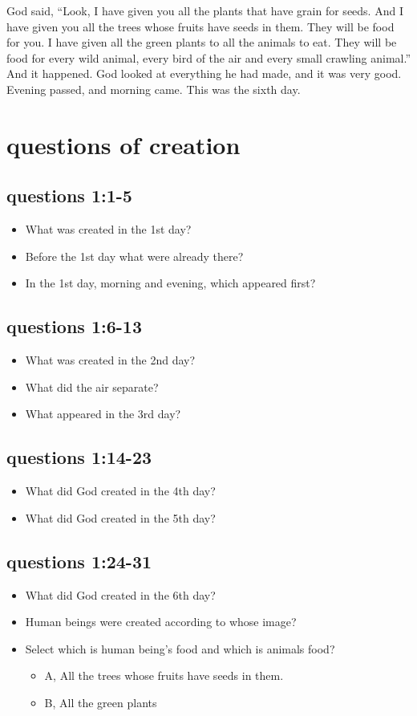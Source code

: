 God said, “Look, I have given you all the plants that have grain for seeds. And I have given you all the trees whose fruits have seeds in them. They will be food for you. I have given all the green plants to all the animals to eat. They will be food for every wild animal, every bird of the air and every small crawling animal.” And it happened. God looked at everything he had made, and it was very good. Evening passed, and morning came. This was the sixth day.

\newpage
\section{questions of creation}
\subsection{questions 1:1-5}
\begin{itemize}
\item What was created in the 1st day? 
\item Before the 1st day what were already there? 
\item In the 1st day, morning and evening, which appeared first?
\end{itemize}

\subsection{questions 1:6-13}
\begin{itemize}
\item What was created in the 2nd day?
\item What did the air separate?
\item What appeared in the 3rd day?
\end{itemize}

\subsection{questions 1:14-23}
\begin{itemize}
\item What did God created in the 4th day?
\item What did God created in the 5th day?
\end{itemize}


\subsection{questions 1:24-31}
\begin{itemize}
\item What did God created in the 6th day?
\item Human beings were created according to whose image?
\item Select which is human being’s food and which is animals food?
\begin{itemize}
\item A, All the trees whose fruits have seeds in them. 
\item B, All the green plants
\end{itemize}
\end{itemize}

